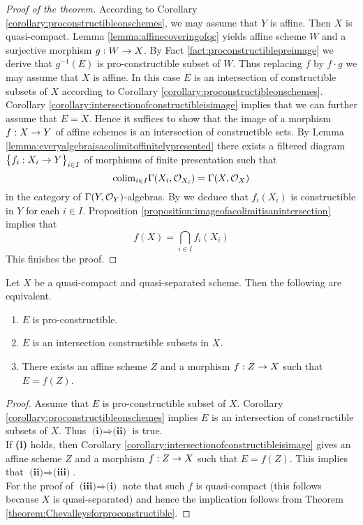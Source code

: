\begin{proof}[Proof of the theorem]
According to Corollary \ref{corollary:proconstructibleonschemes}, we may assume that $Y$ is affine. Then $X$ is quasi-compact. Lemma \ref{lemma:affinecoveringofqc} yields affine scheme $W$ and a surjective morphism $g:W\rightarrow X$. By Fact \ref{fact:proconstructiblepreimage} we derive that $g^{-1}(E)$ is pro-constructible subset of $W$. Thus replacing $f$ by $f\cdot g$ we may assume that $X$ is affine. In this case $E$ is an intersection of constructible subsets of $X$ according to Corollary \ref{corollary:proconstructibleonschemes}. Corollary \ref{corollary:intersectionofconstructibleisimage} implies that we can further assume that $E = X$. Hence it suffices to show that the image of a morphism $f:X\rightarrow Y$ of affine schemes is an intersection of constructible sets. By Lemma \ref{lemma:everyalgebraisacolimitoffinitelypresented} there exists a filtered diagram $\big\{f_i:X_i\rightarrow Y\big\}_{i\in I}$ of morphisms of finite presentation such that 
$$\mathrm{colim}_{i\in I}\Gamma(X_i,{\mathcal O}_{X_i}) = \Gamma(X,{\mathcal O}_X)$$
in the category of $\Gamma(Y,{\mathcal O}_Y)$-algebras. By {\cite[Corollary 3.4]{Constructibleandlocallyconstructiblesets}} we deduce that $f_i(X_i)$ is constructible in $Y$ for each $i\in I$. Proposition \ref{proposition:imageofacolimitisanintersection} implies that
$$f(X) = \bigcap_{i\in I}f_i(X_i)$$
This finishes the proof.
\end{proof}

\begin{corollary}\label{corollary:proconstructibelonqcqs}
Let $X$ be a quasi-compact and quasi-separated scheme. Then the following are equivalent.
\begin{enumerate}[label=\emph{\textbf{(\roman*)}}, leftmargin=*]
\item $E$ is pro-constructible.
\item $E$ is an intersection constructible subsets in $X$.
\item There exists an affine scheme $Z$ and a morphism $f:Z\rightarrow X$ such that $E = f(Z)$.
\end{enumerate}
\end{corollary}
\begin{proof}
Assume that $E$ is pro-constructible subset of $X$. Corollary \ref{corollary:proconstructibleonschemes} implies $E$ is an intersection of constructible subsets of $X$. Thus $\textbf{(i)}\Rightarrow \textbf{(ii)}$ is true.\\
If \textbf{(i)} holds, then Corollary \ref{corollary:intersectionofconstructibleisimage} gives an affine scheme $Z$ and a morphism $f:Z\rightarrow X$ such that $E = f(Z)$. This implies that $\textbf{(ii)}\Rightarrow \textbf{(iii)}$.\\
For the proof of $\textbf{(iii)}\Rightarrow \textbf{(i)}$ note that such $f$ is quasi-compact (this follows because $X$ is quasi-separated) and hence the implication follows from Theorem \ref{theorem:Chevalleysforproconstructible}.
\end{proof}

